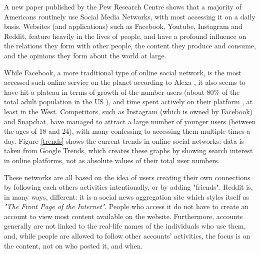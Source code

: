 \documentclass[bsc,frontabs,twoside,singlespacing,parskip,deptreport]{infthesis}
\begin{document}
A new paper published by the Pew Research Centre \cite{pew} shows that a majority of Americans routinely use Social Media Networks, with most accessing it on a daily basis. Websites (and applications) such as Facebook, Youtube, Instagram and Reddit, feature heavily in the lives of people, and have a profound influence on the relations they form with other people, the content they produce and consume, and the opinions they form about the world at large. 

While Facebook, a more traditional type of online social network, is the most accessed such online service on the planet according to Alexa \cite{alexa}, it also seems to have hit a plateau in terms of growth of the number users (about 80\% of the total adult population in the US \cite{pew}), and time spent actively on their platform \cite{pew}, at least in the West. Competitors, such as Instagram (which is owned by Facebook) and Snapchat, have managed to attract a large number of younger users (between the ages of 18 and 24), with many confessing to accessing them multiple times a day. Figure \ref{trends} shows the current trends in online social networks: data is taken from Google Trends, which creates these graphs by showing search interest in online platforms, not as absolute values of their total user numbers. 

These networks are all based on the idea of users creating their own connections by following each others activities intentionally, or by adding "friends". Reddit is, in many ways, different: it is a social news aggregation site which styles itself as \textit{"The Front Page of the Internet"}. People who access it do not have to create an account to view most content available on the website. Furthermore, accounts generally are not linked to the real-life names of the individuals who use them, and, while people are allowed to follow other accounts' activities, the focus is on the content, not on who posted it, and when. 
\end{document}
